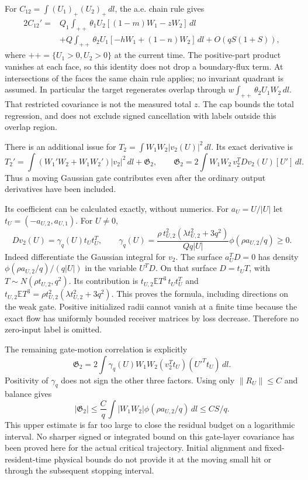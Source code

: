 \documentclass[11pt]{article}
\newcommand{\E}{\mathbb E}\newcommand{\dd}{\,d}
\begin{document}
For $C_{12}=\int(U_1)_+(U_2)_+\dd l$, the a.e. chain rule gives
\begin{align}
 2C_{12}'={}&Q_1\int_{++}\theta_1U_2[(1-m)W_1-zW_2]\dd l\nonumber\\
 &+Q\int_{++}\theta_2U_1[-hW_1+(1-n)W_2]\dd l
                  +O(qS(1+S)),\label{an04pcdv1:overlap}
\end{align}
where $++=\{U_1>0,U_2>0\}$ at the current time.
The positive-part product vanishes at each face, so this identity
does not drop a boundary-flux term. At intersections of the faces
the same chain rule applies; no invariant quadrant is assumed.
In particular the target regenerates overlap through
$w\int_{++}\theta_2U_1W_2\dd l$.
That restricted covariance is not the measured total $z$.
The cap bounds the total regression, and does not exclude signed
cancellation with labels outside this overlap region.

There is an additional issue for
$T_2=\int W_1W_2|v_2(U)|^2\dd l$.
Its exact derivative is
\begin{equation}\label{an04pcdv1:transport}
 T_2'=\int(W_1'W_2+W_1W_2')|v_2|^2\dd l+\mathfrak G_2,
 \qquad
 \mathfrak G_2=2\int W_1W_2\,v_2^TDv_2(U)[U']\dd l.
\end{equation}
Thus a moving Gaussian gate contributes even after the ordinary
output derivatives have been included.

Its coefficient can be calculated exactly, without numerics.
For $a_U=U/|U|$ let $t_U=(-a_{U,2},a_{U,1})$. For $U\ne0$,
\begin{equation}\label{an04pcdv1:hessian}
 Dv_2(U)=\gamma_q(U)t_Ut_U^T,\qquad
 \gamma_q(U)=\frac{\rho\,t_{U,2}^2(\lambda t_{U,2}^2+3q^2)}
                         {Qq|U|}
                 \phi(\rho a_{U,2}/q)\ge0.
\end{equation}
Indeed differentiate the Gaussian integral for $v_2$. The surface
$a_U^TD=0$ has density $\phi(\rho a_{U,2}/q)/(q|U|)$ in the
variable $U^TD$. On that surface $D=t_UT$, with
$T\sim N(\rho t_{U,2},q^2)$. Its contribution is
$t_{U,2}\E T^3\,t_Ut_U^T$ and
$t_{U,2}\E T^3=\rho t_{U,2}^2(\lambda t_{U,2}^2+3q^2)$.
This proves the formula, including directions on the weak gate.
Positive initialized radii cannot vanish at a finite time because
the exact flow has uniformly bounded receiver matrices by loss
decrease. Therefore no zero-input label is omitted.

The remaining gate-motion correlation is explicitly
\begin{equation}\label{an04pcdv1:gate}
 \boxed{\quad\mathfrak G_2=
 2\int\gamma_q(U)W_1W_2
           (v_2^Tt_U)(U'^Tt_U)\dd l.\quad}
\end{equation}
Positivity of $\gamma_q$ does not sign the other three factors.
Using only $\|R_U\|\le C$ and balance gives
\[
 |\mathfrak G_2|\le\frac Cq\int|W_1W_2|
                 \phi(\rho a_{U,2}/q)\dd l\le CS/q.
\]
This upper estimate is far too large to close the residual budget
on a logarithmic interval. No sharper signed or integrated bound
on this gate-layer covariance has been proved here for the actual
critical trajectory. Initial alignment and fixed-resident-time
physical bounds do not provide it at the moving small hit or
through the subsequent stopping interval.
\end{document}
